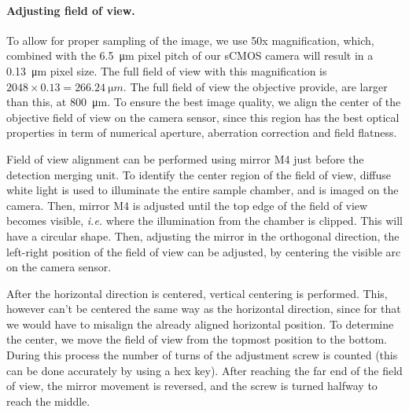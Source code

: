     \paragraph{Adjusting field of view.}
      To allow for proper sampling of the image, we use 50x magnification, which, combined with the \SI{6.5}{\micro m} pixel pitch of our sCMOS camera will result in a \SI{0.13}{\micro m} pixel size. The full field of view with this magnification is $2048 \times 0.13 = \SI{266.24}{\micro m}$. The full field of view the objective provide, are larger than this, at \SI{800}{\micro m}. To ensure the best image quality, we align the center of the objective field of view on the camera sensor, since this region has the best optical properties in term of numerical aperture, aberration correction and field flatness.

      Field of view alignment can be performed using mirror M4 just before the detection merging unit. To identify the center region of the field of view, diffuse white light is used to illuminate the entire sample chamber, and is imaged on the camera. Then, mirror M4 is adjusted until the top edge of the field of view becomes visible, \textit{i.e.} where the illumination from the chamber is clipped. This will have a circular shape. Then, adjusting the mirror in the orthogonal direction, the left-right position of the field of view can be adjusted, by centering the visible arc on the camera sensor.

      After the horizontal direction is centered, vertical centering is performed. This, however can't be centered the same way as the horizontal direction, since for that we would have to misalign the already aligned horizontal position. To determine the center, we move the field of view from the topmost position to the bottom. During this process the number of  turns of the adjustment screw is counted (this can be done accurately by using a hex key). After reaching the far end of the field of view, the mirror movement is reversed, and the screw is turned halfway to reach the middle.

      

